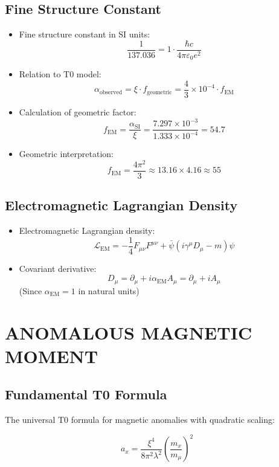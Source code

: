\documentclass[12pt,a4paper]{article}
\begin{document}
	\subsection{Fine Structure Constant}
	\begin{itemize}
		\item Fine structure constant in SI units:
		$$\frac{1}{137.036} = 1 \cdot \frac{\hbar c}{4\pi\varepsilon_0 e^2}$$
		
		\item Relation to T0 model:
		$$\alpha_{\text{observed}} = \xi \cdot f_{\text{geometric}} = \frac{4}{3} \times 10^{-4} \cdot f_{\text{EM}}$$
		
		\item Calculation of geometric factor:
		$$f_{\text{EM}} = \frac{\alpha_{\text{SI}}}{\xi} = \frac{7.297 \times 10^{-3}}{1.333 \times 10^{-4}} = 54.7$$
		
		\item Geometric interpretation:
		$$f_{\text{EM}} = \frac{4\pi^2}{3} \approx 13.16 \times 4.16 \approx 55$$
	\end{itemize}
	
	\subsection{Electromagnetic Lagrangian Density}
	\begin{itemize}
		\item Electromagnetic Lagrangian density:
		$$\mathcal{L}_{\text{EM}} = -\frac{1}{4}F_{\mu\nu}F^{\mu\nu} + \bar{\psi}(i\gamma^\mu D_\mu - m)\psi$$
		
		\item Covariant derivative:
		$$D_\mu = \partial_\mu + i \alpha_{\text{EM}} A_\mu = \partial_\mu + i A_\mu$$
		(Since $\alpha_{\text{EM}} = 1$ in natural units)
	\end{itemize}
	
	\section{ANOMALOUS MAGNETIC MOMENT}
	
	\subsection{Fundamental T0 Formula}
	
	The universal T0 formula for magnetic anomalies with quadratic scaling:
	
	\begin{equation}
		\boxed{a_x = \frac{\xi^4}{8\pi^2 \lambda^2} \left(\frac{m_x}{m_\mu}\right)^2}
	\end{equation}
	
\end{document}
